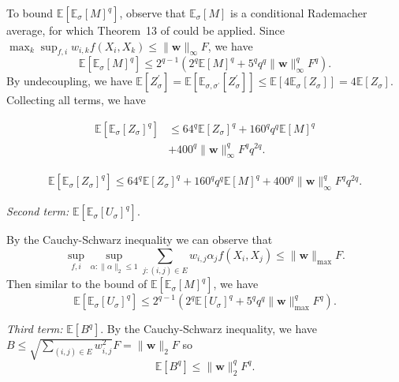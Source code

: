 \documentclass[letterpaper]{article} %
\def\DoubleColumn{}
\def\DoubleColumnEnd{}
\def\SingleColumn{}
\def\SingleColumnEnd{}
\newcommand{\E}{\mathbb{E}}
\newcommand{\weight}{\mathbf{w}}
\newcommand{\rademacher}{\sigma}
\newcommand{\pair}[1]{(#1)}
\begin{document}
To bound $\E[\E_\rademacher[M]^q]$, observe that $\E_\rademacher[M]$ is a conditional Rademacher average, for which Theorem~13 of \cite{Boucheron2005} could be applied. Since $\max_k\sup_{f,i}w_{i,k}f(X_i,X_k)\le \|\weight{}\|_\infty F$, we have
\begin{equation}
    \label{eq:inequality_rademacher_chaos_2}
    \E[\E_\rademacher[M]^q]\le 2^{q-1}(2^q\E[M]^q+5^qq^q\|\weight{}\|_\infty^qF^q).
\end{equation}
By undecoupling, we have $\E[Z_\rademacher^\prime]=\E[\E_{\rademacher,\rademacher^\prime}[Z_\rademacher^\prime]]\le\E[4\E_\rademacher[Z_\rademacher]]=4\E[Z_\rademacher]$. Collecting all terms, we have
\DoubleColumn
\begin{align*}
    \E[\E_\rademacher[Z_\rademacher]^q]&\le 64^q\E[Z_\rademacher]^q+160^qq^q\E[M]^q\\
    &+400^q\|\weight{}\|_\infty^qF^qq^{2q}.
\end{align*}
\DoubleColumnEnd
\SingleColumn
\begin{align*}
    \E[\E_\rademacher[Z_\rademacher]^q]\le 64^q\E[Z_\rademacher]^q+160^qq^q\E[M]^q+400^q\|\weight{}\|_\infty^qF^qq^{2q}.
\end{align*}
\SingleColumnEnd

\textit{Second term:} $\E[\E_\rademacher[U_\rademacher]^q].$

By the Cauchy-Schwarz inequality we can observe that
\[\sup_{f,i}\sup_{\alpha:\|\alpha\|_2\le 1}\sum_{j:\pair{i,j}\in E}w_{i,j}\alpha_jf(X_i,X_j)\le \|\weight{}\|_{\max}F.\]
Then similar to the bound of $\E[\E_\rademacher[M]^q]$, we have
\[\E[\E_\rademacher[U_\rademacher]^q]\le 2^{q-1}(2^q\E[U_\rademacher]^q+5^qq^q\|\weight{}\|_{\max}^qF^q).\]

\textit{Third term:} $\E[B^q]$. By the Cauchy-Schwarz inequality, we have $B\le \sqrt{\sum_{\pair{i,j}\in E}w_{i,j}^2}F= \|\weight{}\|_2F$ so
\[\E[B^q]\le \|\weight{}\|_2^qF^q.\]
\end{document}
